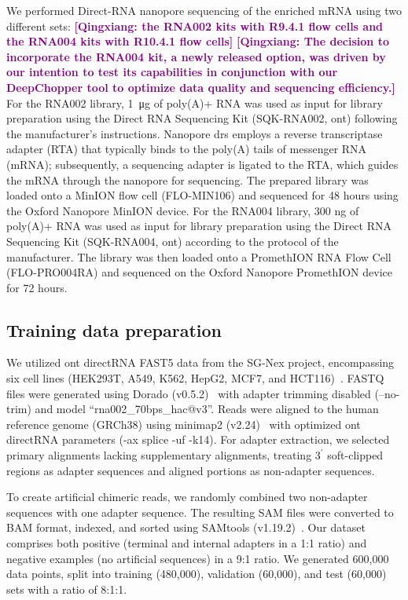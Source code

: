 \documentclass[pdflatex, sn-mathphys-num, lineno]{sn-jnl}%
\newcommand{\qx}[1]{\textcolor{purple}{\textbf{[Qingxiang: #1]}}}
\theoremstyle{thmstyleone}%
\theoremstyle{thmstyletwo}%
\theoremstyle{thmstylethree}%
\begin{document}
We performed Direct-RNA nanopore sequencing of the enriched mRNA using two different sets: \qx{the RNA002 kits with R9.4.1 flow cells and the RNA004 kits with R10.4.1 flow cells} \qx{The decision to incorporate the RNA004 kit, a newly released option, was driven by our intention to test its capabilities in conjunction with our DeepChopper tool to optimize data quality and sequencing efficiency.}
For the RNA002 library, \SI{1}{\micro\gram} of poly(A)+ RNA was used as input for library preparation using the Direct RNA Sequencing Kit (SQK-RNA002, \gls{ont}) following the manufacturer's instructions.
Nanopore \gls{drs} employs a reverse transcriptase adapter (RTA) that typically binds to the poly(A) tails of messenger RNA (mRNA); subsequently, a sequencing adapter is ligated to the RTA, which guides the mRNA through the nanopore for sequencing.
The prepared library was loaded onto a MinION flow cell (FLO-MIN106) and sequenced for 48 hours using the Oxford Nanopore MinION device.
For the RNA004 library, 300 ng of poly(A)+ RNA was used as input for library preparation using the Direct RNA Sequencing Kit (SQK-RNA004, \gls{ont}) according to the protocol of the manufacturer.
The library was then loaded onto a PromethION RNA Flow Cell (FLO-PRO004RA) and sequenced on the Oxford Nanopore PromethION device for 72 hours.

\subsection{Training data preparation}\label{ssec:data}

We utilized \gls{ont} directRNA FAST5 data from the SG-Nex project, encompassing six cell lines (HEK293T, A549, K562, HepG2, MCF7, and HCT116)~\cite{chen2021systematic}.
FASTQ files were generated using Dorado (v0.5.2)~\cite{dorado2023} with adapter trimming disabled (--no-trim) and  model ``rna002\_70bps\_hac@v3''.
Reads were aligned to the human reference genome (GRCh38) using minimap2 (v2.24)~\cite{li2018minimap2} with optimized \gls{ont} directRNA parameters (-ax splice -uf -k14).
For adapter extraction, we selected primary alignments lacking supplementary alignments, treating \(3^{\prime}\)  soft-clipped regions as adapter sequences and aligned portions as non-adapter sequences.

To create artificial chimeric reads, we randomly combined two non-adapter sequences with one adapter sequence.
The resulting SAM files were converted to BAM format, indexed, and sorted using SAMtools (v1.19.2)~\cite{li2009sequence}.
Our dataset comprises both positive (terminal and internal adapters in a 1:1 ratio) and negative examples (no artificial sequences) in a 9:1 ratio.
We generated 600,000 data points, split into training (480,000), validation (60,000), and test (60,000) sets with a ratio of 8:1:1.
\end{document}
